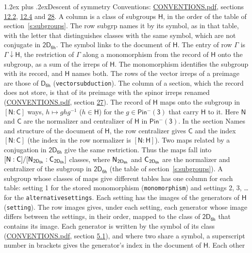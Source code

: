 \documentclass[10pt,a4paper]{article}
\makeatletter
\renewcommand\section{\@startsection{section}{1}{\z@}{-3ex plus -1ex minus -.2ex}%
  {1.2ex plus .2ex}{\normalfont\large\sffamily\bfseries\color{parttitle}}}
\numberwithin{equation}{section}
\newcommand{\grp}[1]{\mathsf{#1}}
\newcommand{\grpindex}[2]{[#1 : #2]}
\newcommand{\restr}[2]{#1\!\downarrow#2}
\newcommand{\hairsp}{\mkern1mu}
\makeatother
\begin{document}
\section{Descent of symmetry}\label{s:subduction}
Conventions: \href{../../CONVENTIONS.pdf}{CONVENTIONS.pdf}, sections \href{../../../rotation/CONVENTIONS.pdf\#conv.12.2}{12.2}, \href{../../../rotation/CONVENTIONS.pdf\#conv.12.4}{12.4} and \href{../../CONVENTIONS.pdf\#conv.28}{28}.
A column is a class of subgroups $\grp{H}$, in the order of the table of section~\ref{s:subgroups}. The row subgrp names it by its symbol, as in that table, with the letter that distinguishes classes with the same symbol, which are not conjugate in $\grp{2D_{6h}}$. The symbol links to the document of $\grp{H}$. The entry of row $\Gamma$ is $\restr{\Gamma}{\grp{H}}$, the restriction of $\Gamma$ along a monomorphism from the record of $\grp{H}$ onto the subgroup, as a sum of the irreps of $\grp{H}$. The monomorphism identifies the subgroup with its record, and $\grp{H}$ names both. The rows of the vector irreps of a preimage are those of \href{../../../rotation/data/pdf/D6h.pdf}{$\grp{D_{6h}}$} (\texttt{vectorsubduction}). The column of a section, which the record does not store, is that of its preimage with the spinor irreps renamed (\href{../../CONVENTIONS.pdf}{CONVENTIONS.pdf}, section \href{../../CONVENTIONS.pdf\#conv.27}{27}). \label{n:group.normalizer.o3}\label{n:group.centralizer.o3}\label{n:element.h}The record of $\grp{H}$ maps onto the subgroup in $\grpindex{\grp{N}}{\grp{C}}$ ways, $h \mapsto g h g^{-1}$ ($h \in \grp{H}$) for the $g \in \grp{Pin^{-}(3)}$ that carry $\grp{H}$ to it. Here $\grp{N}$ and $\grp{C}$ are the normalizer and centralizer of $\grp{H}$ in \href{Pinminus3.pdf}{$\grp{Pin^{-}(3)}$}. In the section Names and structure of the document of $\grp{H}$, the row centralizer gives $\grp{C}$ and the index $\grpindex{\grp{N}}{\grp{C}}$ (the index in the row normalizer is $\grpindex{\grp{N}}{\grp{H}}$). Two maps related by a conjugation in $\grp{2D_{6h}}$ give the same restriction. Thus the maps fall into $\grpindex{\grp{N}}{\grp{C}}/\grpindex{\grp{N}_{\hairsp \grp{2D_{6h}}}}{\grp{C}_{\hairsp \grp{2D_{6h}}}}$ classes, where $\grp{N}_{\hairsp \grp{2D_{6h}}}$ and $\grp{C}_{\hairsp \grp{2D_{6h}}}$ are the normalizer and centralizer of the subgroup in $\grp{2D_{6h}}$ (the table of section~\ref{s:subgroups}). \label{n:head.setting}A subgroup whose classes of maps give different tables has one column for each table: setting 1 for the stored monomorphism (\texttt{monomorphism}) and settings 2, 3, \dots{} for the \texttt{alternativesettings}. Each setting has the images of the generators of $\grp{H}$ (\texttt{setting}). \label{n:head.images}The row images gives, under each setting, each generator whose image differs between the settings, in their order, mapped to the class of $\grp{2D_{6h}}$ that contains its image. \label{n:element.generator.index}Each generator is written by the symbol of its class (\href{../../CONVENTIONS.pdf}{CONVENTIONS.pdf}, section \href{../../../rotation/CONVENTIONS.pdf\#conv.5.1}{5.1}), and where two share a symbol, a superscript number in brackets gives the generator's index in the document of $\grp{H}$. \label{n:irrep.Delta}Each other 
\end{document}
